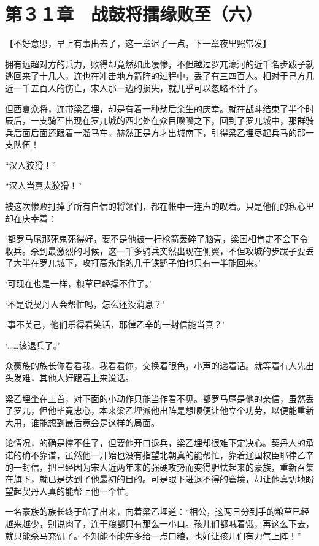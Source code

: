 \section{第３１章　战鼓将擂缘败至（六）}

【不好意思，早上有事出去了，这一章迟了一点，下一章夜里照常发】

拥有远超对方的兵力，败得却竟然如此凄惨，不但越过罗兀濠河的近千名步跋子就逃回来了十几人，连也在冲击地方箭阵的过程中，丢了有三四百人。相对于己方几近一千五百人的伤亡，宋人那一边的损失，就几乎可以忽略不计了。

但西夏众将，连带梁乙埋，却是有着一种劫后余生的庆幸。就在战斗结束了半个时辰后，一支骑军出现在罗兀城的西北处在众目睽睽之下，回到了罗兀城中，那群骑兵后面后面还跟着一溜马车，赫然正是方才出城南下，引得梁乙埋尽起兵马的那一支队伍！

“汉人狡猾！”

“汉人当真太狡猾！”

被这次惨败打掉了所有自信的将领们，都在帐中一连声的叹着。只是他们的私心里却在庆幸着：

‘都罗马尾那死鬼死得好，要不是他被一杆枪箭轰碎了脑壳，梁国相肯定不会下令收兵。杀到最激烈的时候，这一千多骑兵突然出现在侧翼，不但攻城的步跋子要丢了大半在罗兀城下，攻打高永能的几千铁鹞子怕也只有一半能回来。’

‘可现在也是一样，粮草已经撑不住了。’

‘不是说契丹人会帮忙吗，怎么还没消息？’

‘事不关己，他们乐得看笑话，耶律乙辛的一封信能当真？’

‘……该退兵了。’

众豪族的族长你看看我，我看看你，交换着眼色，小声的递着话。就等着有人先出头发难，其他人好跟着上来说话。

梁乙埋坐在上首，对下面的小动作只能当作看不见。都罗马尾是他的亲信，虽然丢了罗兀，但他毕竟忠心，本来梁乙埋派他出阵是想顺便让他立个功劳，以便能重新大用，谁能想到最后竟会是这样的局面。

论情况，的确是撑不住了，但要他开口退兵，梁乙埋却很难下定决心。契丹人的承诺的确不靠谱，虽然他一开始也没有指望北朝真的能帮忙，靠着辽国权臣耶律乙辛的一封信，把已经因为宋人近两年来的强硬攻势而变得胆怯起来的豪族，重新召集在旗下，就已是达到了他最初的目的。可是眼下进退不得的窘境，却让他真切地盼望起契丹人真的能帮上他一个忙。

一名豪族的族长终于站了出来，向着梁乙埋道：“相公，这两日分到手的粮草已经越来越少，别说肉了，连干粮都只有那么一小口。孩儿们都喊着饿，再这么下去，就只能杀马充饥了。不知能不能先多给一点口粮，也好让孩儿们有力气上阵！”

